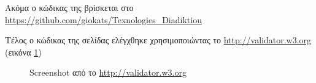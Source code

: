 \documentclass{assignment}
\begin{document}
\begin{Assignment}
\inputminted[linenos,tabsize=2]{html}{../../index.html}

\inputminted[linenos,tabsize=2]{css}{../../theme.css}

\inputminted[linenos,tabsize=2]{js}{../../javascript.js}

Ακόμα ο κώδικας της βρίσκεται στο \url{https://github.com/giokats/Texnologies_Diadiktiou}
\end{Assignment}

Τέλος ο κώδικας της σελίδας ελέγχθηκε χρησιμοποιώντας το \url{http://validator.w3.org} (εικόνα 
\ref{fig:date})

\begin{figure}
\begin{center}
\caption{Screenshot από το \url{http://validator.w3.org} }
\label{fig:date}
\end{center}
\end{figure}
\end{document}
